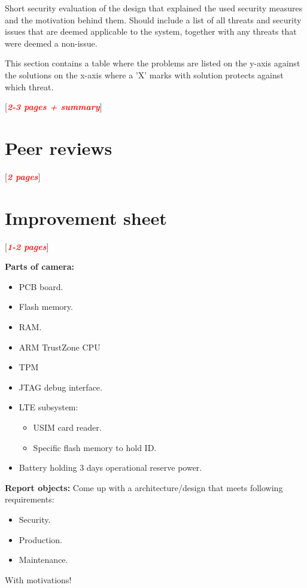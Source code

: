 \documentclass[10pt]{article}
\newcommand{\comm}[1]{{\leavevmode\color{gray}#1}}
\newcommand{\todo}[1]{
  \begin{center}
    [\textcolor{red}{\textbf{\textit{#1}}}]
  \end{center}
}
\begin{document}
  \comm{%
    Short security evaluation of the design that explained the used security
    measures and the motivation behind them. Should include a list of all
    threats and security issues that are deemed applicable to the system,
    together with any threats that were deemed a non-issue.

    This section contains a table where the problems are listed on the y-axis
    against the solutions on the x-axis where a 'X' marks with solution
    protects against which threat.
  }

    \todo{2-3 pages + summary}

    

  \section{Peer reviews}
    \todo{2 pages}

  \section{Improvement sheet}
    \todo{1-2 pages}

  \newpage

  \textbf{Parts of camera:}
  \begin{itemize}
    \item{PCB board.}
    \item{Flash memory.}
    \item{RAM.}
    \item{ARM TrustZone CPU}
    \item{TPM}
    \item{JTAG debug interface.}
    \item{LTE subsystem:}
    \begin{itemize}
      \item{USIM card reader.}
      \item{Specific flash memory to hold ID.}
    \end{itemize}
    \item{Battery holding 3 days operational reserve power.}
  \end{itemize}

  \textbf{Report objects:}
  Come up with a architecture/design that meets following requirements:
  \begin{itemize}
    \item{Security.}
    \item{Production.}
    \item{Maintenance.}
  \end{itemize}
  With motivations!
\end{document}
